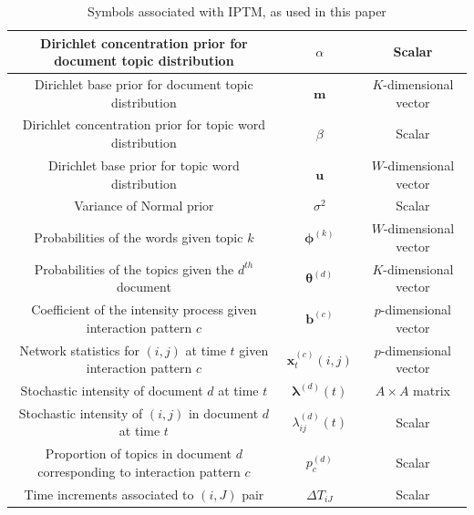 \documentclass[a4paper]{article}
\begin{document}
\begin{table}[ht]
{\begin{tabular}{ |c|c|c|}
  			\hline 	
  			Dirichlet concentration prior for document topic distribution&$\alpha$ & Scalar \\
  			\hline	
  			Dirichlet base prior for document topic distribution&$\boldsymbol{m}$ & $K$-dimensional vector \\
  			\hline			
  			Dirichlet concentration prior for topic word distribution&$\beta$ & Scalar \\
  			\hline			 
  			Dirichlet base prior for topic word distribution&$\boldsymbol{u}$ & $W$-dimensional vector  \\
  			\hline				 	
  			Variance of Normal prior&$\sigma^2$ & Scalar \\
  			\hline		
  			Probabilities of the words given topic $k$ &$\boldsymbol{\phi}^{(k)}$ & $W$-dimensional vector\\
  			\hline
  			Probabilities of the topics given the $d^{th}$ document &$\boldsymbol{\theta}^{(d)}$ & $K$-dimensional vector\\
  			\hline		
  			Coefficient of the intensity process given interaction pattern $c$ &$\boldsymbol{b}^{(c)}$ & $p$-dimensional vector\\
  			\hline		
  			Network statistics for $(i, j)$ at time $t$ given interaction pattern $c$ &$\boldsymbol{x}^{(c)}_t{(i,j)}$ & $p$-dimensional vector\\
  			\hline		
  			Stochastic intensity of document $d$ at time $t$ & $\boldsymbol{\lambda}^{(d)}(t)$ & $A\times A$ matrix\\
  			\hline
  		  	Stochastic intensity of $(i, j)$ in document $d$ at time $t$ & ${\lambda}_{ij}^{(d)}(t)$ & Scalar\\
  		  	\hline	
  		  	  		  	Proportion of topics in document $d$ corresponding to interaction pattern $c$ & $p_c^{(d)}$ & Scalar\\
  		  	  		  	\hline
  		  Time increments associated to $(i, J)$ pair & $\Delta T_{iJ}$ & Scalar\\
  		  		\hline
  			\hline
  		\end{tabular}}
  		\caption {Symbols associated with IPTM, as used in this paper}
  		\label{table:SymbolsIPTM}
  	\end{table}
  	\normalsize
  	\fi
\end{document}
